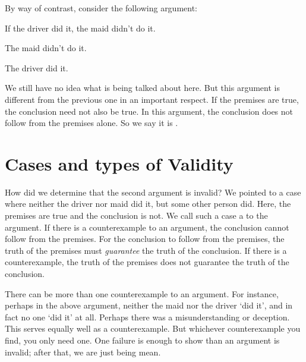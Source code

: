 \documentclass[PHIL101-Textbook.tex]{subfiles}
\begin{document}


By way of contrast, consider the following argument:
\begin{earg}\label{argMaidDriver}
	\item[] If the driver did it, the maid didn't do it.
	\item[] The maid didn't do it.
	\item[\therefore] The driver did it.
\end{earg}
We still have no idea what is being talked about here. But this argument is different from the previous one in an important respect. If the premises are true, the conclusion need not also be true. 
In this argument, the conclusion does not follow from the premises alone. So we say it is .

\section{Cases and types of Validity}

How did we determine that the second argument is invalid? We pointed to a case where neither the driver nor maid did it, but some other person did. Here, the premises are true and the conclusion is not. We call such a case a  to the argument. If there is a counterexample to an argument, the conclusion cannot follow from the premises. For the conclusion to follow from the premises, the truth of the premises must \emph{guarantee} the truth of the conclusion. If there is a counterexample, the truth of the premises does not guarantee the truth of the conclusion.

There can be more than one counterexample to an argument. For instance, perhaps in the above argument, neither the maid nor the driver `did it', and in fact no one `did it' at all. Perhaps there was a misunderstanding or deception. This serves equally well as a counterexample. But whichever counterexample you find, you only need one. One failure is enough to show than an argument is invalid; after that, we are just being mean.
\end{document}

